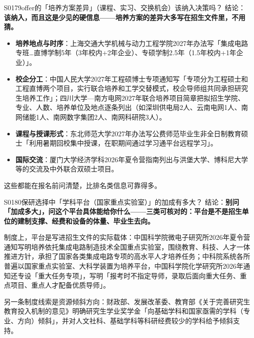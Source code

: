 \begin{qa}{S0179}{offer的「培养方案差异」（课程、实习、交换机会）该纳入决策吗？}
结论：\textbf{该纳入，而且这是少见的硬信息——培养方案的差异大多写在招生文件里，不用猜。}

\begin{itemize}
  \item \textbf{培养地点与时序}：上海交通大学机械与动力工程学院2027年办法写「集成电路专班…直博学制5年（3年校内+2年企业）、专硕学制2.5年（1.5年校内+1年企业）」。
  \item \textbf{校企分工}：中国人民大学2027年工程硕博士专项通知写「专项分为工程硕士和工程直博两个项目，实行联合培养和工学交替模式，校企导师组共同承担研究生培养工作」；四川大学—南方电网2027年联合培养项目简章把拟招生学院、专业、人数、培养单位及地点逐条列出（如深圳供电局2人、云南电网1人、南网储能1人、南网数字集团2人、南网科研院3人）。
  \item \textbf{课程与授课形式}：东北师范大学2027年办法写公费师范毕业生非全日制教育硕士「利用暑期回校集中授课，在职期间通过学习通平台远程学习」。
  \item \textbf{国际交流}：厦门大学经济学科2026年夏令营指南列出与洪堡大学、博科尼大学等的交流及中外联合双硕士项目。
\end{itemize}

这些都能在报名前问清楚，比排名类信息可靠得多。
\end{qa}

\begin{qa}{S0180}{保研选择中「学科平台（国家重点实验室）」的加成有多大？}
结论：\textbf{别问「加成多大」，问这个平台具体能给你什么——三类可核对的：平台是不是招生单位的建制支撑、经费和设备的体量、毕业生去向。}

制度上，平台是写进招生文件的实际载体：中国科学院微电子研究所2026年夏令营通知写明培养依托集成电路制造技术全国重点实验室，围绕教育、科技、人才一体推进方针，承担了国家各类集成电路专项的高水平人才培养任务；中科院系统各所普遍以国家重点实验室、大科学装置为培养平台，中国科学院化学研究所2026年通知还专设「重大任务专项」，写明「报考时不指定导师，录取后面向重大任务、重点项目、重点人才配备优质导师」。

另一条制度线索是资源倾斜方向：财政部、发展改革委、教育部《关于完善研究生教育投入机制的意见》明确研究生学业奖学金「向基础学科和国家亟需的学科（专业、方向）倾斜」，并对人文社科、基础学科等科研经费较少的学科给予倾斜支持。
\end{qa}

